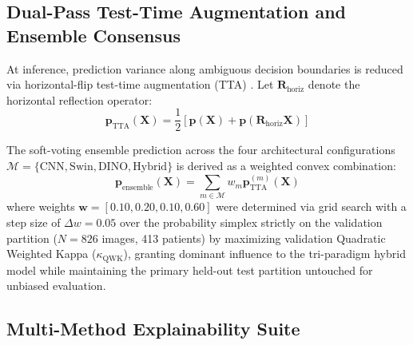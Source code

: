 \documentclass[10pt,journal]{IEEEtran}
\begin{document}
\subsection{Dual-Pass Test-Time Augmentation and Ensemble Consensus}
\label{subsec:tta}

At inference, prediction variance along ambiguous decision boundaries is reduced via horizontal-flip test-time augmentation (TTA) \cite{shanmugam2021tta}. Let $\mathbf{R}_{\text{horiz}}$ denote the horizontal reflection operator:
\begin{equation}
\mathbf{p}_{\text{TTA}}(\mathbf{X}) = \frac{1}{2}\left[ \mathbf{p}(\mathbf{X}) + \mathbf{p}(\mathbf{R}_{\text{horiz}}\mathbf{X}) \right]
\label{eq:tta}
\end{equation}

The soft-voting ensemble prediction across the four architectural configurations $\mathcal{M} = \{\text{CNN}, \text{Swin}, \text{DINO}, \text{Hybrid}\}$ is derived as a weighted convex combination:
\begin{equation}
\mathbf{p}_{\text{ensemble}}(\mathbf{X}) = \sum_{m \in \mathcal{M}} w_m \mathbf{p}_{\text{TTA}}^{(m)}(\mathbf{X})
\label{eq:ensemble}
\end{equation}
where weights $\mathbf{w} = [0.10, 0.20, 0.10, 0.60]$ were determined via grid search with a step size of $\Delta w = 0.05$ over the probability simplex strictly on the validation partition ($N = 826$ images, 413 patients) by maximizing validation Quadratic Weighted Kappa ($\kappa_{\text{QWK}}$), granting dominant influence to the tri-paradigm hybrid model while maintaining the primary held-out test partition untouched for unbiased evaluation.

\subsection{Multi-Method Explainability Suite}
\label{subsec:xai}
\end{document}
